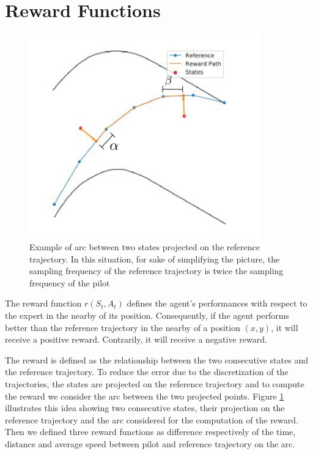 \section{Reward Functions}
\label{sec:reward_function}
\begin{figure}
    \centering
 	  \captionsetup{width=10cm}
      \includegraphics[width=10cm]{./img/reward2}
     \caption{Example of arc between two states projected on the reference trajectory. In this situation, for sake of simplifying the picture, the sampling frequency of the reference trajectory is twice the sampling frequency of the pilot}
   \label{fig:reward}
  \end{figure}
The reward function $r(S_t,A_t)$ defines the agent's performances with respect to the expert in the nearby of its position. Consequently, if the agent performs better than the reference trajectory in the nearby of a position $(x,y)$, it will receive a positive reward. Contrarily, it will receive a negative reward.

The reward is defined as the relationship between the two consecutive states and the reference trajectory. To reduce the error due to the discretization of the trajectories, the states are projected on the reference trajectory and to compute the reward we consider the arc between the two projected points. Figure \ref{fig:reward} illustrates this idea showing two consecutive states, their projection on the reference trajectory and the arc considered for the computation of the reward. Then we defined three reward functions as difference respectively of the time, distance and average speed between pilot and reference trajectory on the arc.

